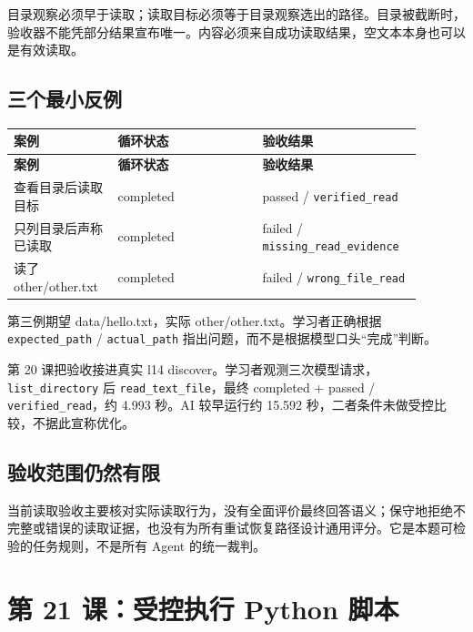\documentclass[UTF8,zihao=-4,fontset=fandol]{ctexart}
\begin{document}
目录观察必须早于读取；读取目标必须等于目录观察选出的路径。目录被截断时，验收器不能凭部分结果宣布唯一。内容必须来自成功读取结果，空文本本身也可以是有效读取。

\subsection{三个最小反例}

{\small\setlength{\tabcolsep}{4pt}
\renewcommand{\arraystretch}{1.25}
\begin{longtable}{>{\raggedright\arraybackslash}p{0.23\linewidth}>{\raggedright\arraybackslash}p{0.33\linewidth}>{\raggedright\arraybackslash}p{0.33\linewidth}}
\toprule
\textbf{案例} & \textbf{循环状态} & \textbf{验收结果} \\
\midrule\endfirsthead
\toprule
\textbf{案例} & \textbf{循环状态} & \textbf{验收结果} \\
\midrule\endhead
\bottomrule\endfoot
查看目录后读取目标 & completed & passed / \nolinkurl{verified_read} \\
只列目录后声称已读取 & completed & failed / \nolinkurl{missing_read_evidence} \\
读了 other/other.txt & completed & failed / \nolinkurl{wrong_file_read} \\
\end{longtable}}

第三例期望 data/hello.txt，实际 other/other.txt。学习者正确根据 \nolinkurl{expected_path} / \nolinkurl{actual_path} 指出问题，而不是根据模型口头“完成”判断。

第 20 课把验收接进真实 l14 discover。学习者观测三次模型请求，\nolinkurl{list_directory} 后 \nolinkurl{read_text_file}，最终 completed + passed / \nolinkurl{verified_read}，约 4.993 秒。AI 较早运行约 15.592 秒，二者条件未做受控比较，不据此宣称优化。

\subsection{验收范围仍然有限}

当前读取验收主要核对实际读取行为，没有全面评价最终回答语义；保守地拒绝不完整或错误的读取证据，也没有为所有重试恢复路径设计通用评分。它是本题可检验的任务规则，不是所有 Agent 的统一裁判。

\section{第 21 课：受控执行 Python 脚本}
\end{document}
